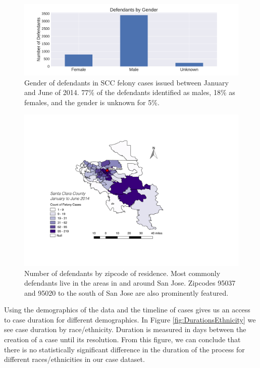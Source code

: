 \documentclass{AISB2008}
\begin{document}
\begin{figure}[h!]
\begin{center}
\includegraphics[width=0.70\columnwidth]{figures/gender/gender}
\caption{Gender of defendants in SCC felony cases issued between January and June of 2014. 77\% of the defendants identified as males, 18\% as females, and the gender is unknown for 5\%.
\label{fig:GenderBreakdown}%
}
\end{center}
\end{figure}

\begin{figure}[h!]
\begin{center}
\includegraphics[width=0.70\columnwidth]{figures/scc_map1/scc_map1}
\caption{Number of defendants by zipcode of residence. Most commonly defendants live in the areas in and around San Jose. Zipcodes 95037 and 95020 to the south of San Jose are also prominently featured.
\label{fig:map}%
}
\end{center}
\end{figure}

Using the demographics of the data and the timeline of cases gives us an
access to case duration for different demographics. In Figure
\ref{fig:DurationsEthnicity} we see case duration by race/ethnicity.
Duration is measured in days between the creation of a case until its
resolution. From this figure, we can conclude that there is no
statistically significant difference in the duration of the process for
different races/ethnicities in our case dataset.
\end{document}

